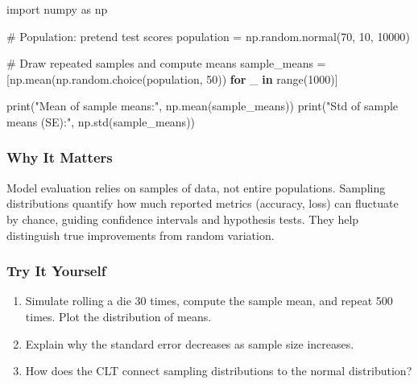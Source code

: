 \documentclass[
  letterpaper,
  DIV=11,
  numbers=noendperiod]{scrreprt}
\newenvironment{Shaded}{\begin{snugshade}}{\end{snugshade}}
\newcommand{\BuiltInTok}[1]{\textcolor[rgb]{0.00,0.23,0.31}{#1}}
\newcommand{\CommentTok}[1]{\textcolor[rgb]{0.37,0.37,0.37}{#1}}
\newcommand{\ControlFlowTok}[1]{\textcolor[rgb]{0.00,0.23,0.31}{\textbf{#1}}}
\newcommand{\DecValTok}[1]{\textcolor[rgb]{0.68,0.00,0.00}{#1}}
\newcommand{\ImportTok}[1]{\textcolor[rgb]{0.00,0.46,0.62}{#1}}
\newcommand{\KeywordTok}[1]{\textcolor[rgb]{0.00,0.23,0.31}{\textbf{#1}}}
\newcommand{\NormalTok}[1]{\textcolor[rgb]{0.00,0.23,0.31}{#1}}
\newcommand{\OperatorTok}[1]{\textcolor[rgb]{0.37,0.37,0.37}{#1}}
\newcommand{\StringTok}[1]{\textcolor[rgb]{0.13,0.47,0.30}{#1}}
\providecommand{\tightlist}{%
  \setlength{\itemsep}{0pt}\setlength{\parskip}{0pt}}
\begin{document}
\begin{Shaded}
\begin{Highlighting}[]
\ImportTok{import}\NormalTok{ numpy }\ImportTok{as}\NormalTok{ np}

\CommentTok{\# Population: pretend test scores}
\NormalTok{population }\OperatorTok{=}\NormalTok{ np.random.normal(}\DecValTok{70}\NormalTok{, }\DecValTok{10}\NormalTok{, }\DecValTok{10000}\NormalTok{)}

\CommentTok{\# Draw repeated samples and compute means}
\NormalTok{sample\_means }\OperatorTok{=}\NormalTok{ [np.mean(np.random.choice(population, }\DecValTok{50}\NormalTok{)) }\ControlFlowTok{for}\NormalTok{ \_ }\KeywordTok{in} \BuiltInTok{range}\NormalTok{(}\DecValTok{1000}\NormalTok{)]}

\BuiltInTok{print}\NormalTok{(}\StringTok{"Mean of sample means:"}\NormalTok{, np.mean(sample\_means))}
\BuiltInTok{print}\NormalTok{(}\StringTok{"Std of sample means (SE):"}\NormalTok{, np.std(sample\_means))}
\end{Highlighting}
\end{Shaded}

\subsubsection{Why It Matters}\label{why-it-matters-29}

Model evaluation relies on samples of data, not entire populations.
Sampling distributions quantify how much reported metrics (accuracy,
loss) can fluctuate by chance, guiding confidence intervals and
hypothesis tests. They help distinguish true improvements from random
variation.

\subsubsection{Try It Yourself}\label{try-it-yourself-131}

\begin{enumerate}
\def\labelenumi{\arabic{enumi}.}
\tightlist
\item
  Simulate rolling a die 30 times, compute the sample mean, and repeat
  500 times. Plot the distribution of means.
\item
  Explain why the standard error decreases as sample size increases.
\item
  How does the CLT connect sampling distributions to the normal
  distribution?
\end{enumerate}
\end{document}
